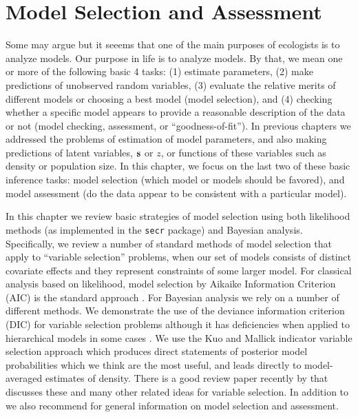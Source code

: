 \chapter{
Model Selection and Assessment
}
\label{chapt.gof}

\vspace{.3in}


Some may argue but it seeems that one of the main purposes of ecologists is
to analyze models.
Our purpose in life is to analyze models. By that, we mean one or more
of the following basic 4 tasks: (1) estimate parameters, (2) make predictions
of unobserved random variables, (3) evaluate the
relative merits of different models or choosing a best model (model
selection), and (4)  checking whether a specific model appears to provide a
reasonable description of the data or not (model checking, assessment,
or ``goodness-of-fit'').  In previous chapters we
addressed the problems of estimation of model parameters, 
and also making
predictions of latent variables, ${\bf s}$ or $z$, or
functions of these variables such as density or population size.
In this chapter, we focus on the last two of these basic
inference tasks: model selection (which model or models should be
favored), and model assessment (do the data appear to be consistent
with a particular model).


In this chapter we review  basic strategies of model selection 
using both likelihood methods (as
implemented in the \mbox{\tt secr} package) and Bayesian
analysis.
Specifically,
we review a number of standard methods of model selection that apply
to ``variable selection'' problems, when our set of models
consists of distinct covariate effects and they represent constraints
of some larger model.
For classical analysis based on likelihood, model selection by Aikaike Information
Criterion (AIC) is the standard approach \citep{burnham_anderson:2002}.  For
Bayesian analysis we rely on a number of different methods.  We
demonstrate the use of the deviance information criterion (DIC)
\citep{spiegelhalter_etal:2002} for variable selection problems
although it has deficiencies when applied to hierarchical models in
some cases \citep{millar:2009}. 
We use the
Kuo and Mallick indicator variable selection approach
\citep{kuo_mallick:1998} which
produces direct statements
of posterior model probabilities which we think are the most useful,
and leads directly to model-averaged estimates of density.  There is a
good review paper recently by \citet{ohara_sillanpaa:2009} that discusses
these and many other related ideas for variable selection.
 In addition to \citet{ohara_sillanpaa:2009} we
also recommend \citet[][Chapt. 7]{link_barker:2010} for general
information on model selection and assessment.

